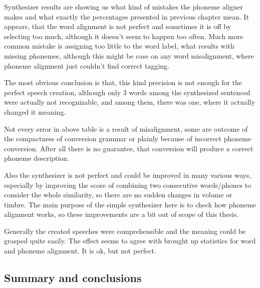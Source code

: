 \documentclass[12pt,a4paper,english]{article}
\begin{document}
Synthesizer results are showing us what kind of mistakes the phoneme aligner makes and what exactly the percentages presented in previous chapter mean. \newline
It appears, that the word alignment is not perfect and sometimes it is off by selecting too much, although it doesn't seem to happen too often. Much more common mistake is assigning too little to the word label, what results with missing phonemes, although this might be case on any word misalignment, where phoneme alignment just couldn't find correct tagging. \newline

The most obvious conclusion is that, this kind precision is not enough for the perfect speech creation, although only 3 words among the synthesized sentenced were actually not recognizable, and among them, there was one, where it actually changed it meaning. \newline

Not every error in above table is a result of misalignment, some are outcome of the compactness of conversion grammar or plainly because of incorrect phoneme conversion. After all there is no guarantee, that conversion will produce a correct phoneme description. \newline

Also the synthesizer is not perfect and could be improved in many various ways, especially by improving the score of combining two consecutive words/phones to consider the whole similarity, so there are no sudden changes in volume or timbre. The main purpose of the simple synthesizer here is to check how phoneme alignment works, so these improvements are a bit out of scope of this thesis. \newline

Generally the created speeches were comprehensible and the meaning could be grasped quite easily. The effect seems to agree with brought up statistics for word and phoneme alignment. It is ok, but not perfect.


\newpage
\begin{center}
    \section{Summary and conclusions}
\end {center}
\setcounter{equation}{0}
\end{document}
